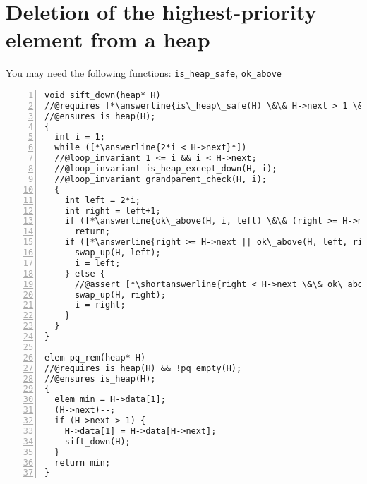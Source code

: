 \section*{Deletion of the highest-priority element from a heap%
}

You may need the following functions: \lstinline'is_heap_safe',
\lstinline'ok_above'
\begin{lstlisting}[numbers=left]
void sift_down(heap* H)
//@requires [*\answerline{is\_heap\_safe(H) \&\& H->next > 1 \&\& is\_heap\_except\_down(H, 1)}*];
//@ensures is_heap(H);
{
  int i = 1;
  while ([*\answerline{2*i < H->next}*])
  //@loop_invariant 1 <= i && i < H->next;
  //@loop_invariant is_heap_except_down(H, i);
  //@loop_invariant grandparent_check(H, i);
  {
    int left = 2*i;
    int right = left+1;
    if ([*\answerline{ok\_above(H, i, left) \&\& (right >= H->next || ok\_above(H, i, right))}*])
      return;
    if ([*\answerline{right >= H->next || ok\_above(H, left, right)}*]) {
      swap_up(H, left);
      i = left;
    } else {
      //@assert [*\shortanswerline{right < H->next \&\& ok\_above(H, right, left)\hspace{-4.6em}}*];
      swap_up(H, right);
      i = right;
    }
  }
}

elem pq_rem(heap* H)
//@requires is_heap(H) && !pq_empty(H);
//@ensures is_heap(H);
{
  elem min = H->data[1];
  (H->next)--;
  if (H->next > 1) {
    H->data[1] = H->data[H->next];
    sift_down(H);
  }
  return min;
}
\end{lstlisting}



